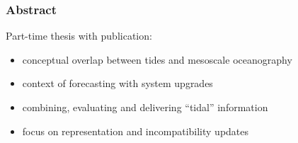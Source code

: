 \begin{frame}
\frametitle{Abstract}

Part-time thesis with publication:
\begin{itemize}
    \item conceptual overlap between tides and mesoscale oceanography
    \item context of  forecasting with system upgrades
    \item combining, evaluating and delivering ``tidal'' information
    \item focus on representation and incompatibility
     updates 
\end{itemize}

\end{frame}